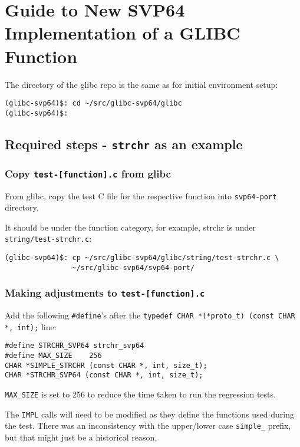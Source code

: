 \section{Guide to New SVP64 Implementation of a GLIBC Function}

The directory of the glibc repo is the same as for initial environment setup:

\begin{verbatim}
(glibc-svp64)$: cd ~/src/glibc-svp64/glibc
(glibc-svp64)$:
\end{verbatim}

\subsection{Required steps - \texttt{strchr} as an example}

\subsubsection{Copy \texttt{test-[function].c} from glibc}

From glibc, copy the test C file for the respective function
into \texttt{svp64-port} directory.

It should be under the function category, for example, strchr is
under \texttt{string/test-strchr.c}:

\begin{verbatim}
(glibc-svp64)$: cp ~/src/glibc-svp64/glibc/string/test-strchr.c \
                ~/src/glibc-svp64/svp64-port/
\end{verbatim}

\subsubsection{Making adjustments to \texttt{test-[function].c}}

Add the following \texttt{\#define}'s after the
\texttt{typedef CHAR *(*proto\_t) (const CHAR *, int);} line:

\begin{verbatim}
#define STRCHR_SVP64 strchr_svp64
#define MAX_SIZE    256
CHAR *SIMPLE_STRCHR (const CHAR *, int, size_t);
CHAR *STRCHR_SVP64 (const CHAR *, int, size_t);
\end{verbatim}

\texttt{MAX\_SIZE} is set to 256 to reduce the time taken to run
the regression tests.

The \texttt{IMPL} calls will need to be modified as they define the
functions used during the test. There was an inconsistency with the
upper/lower case \texttt{simple\_} prefix, but that might just be a
historical reason.

